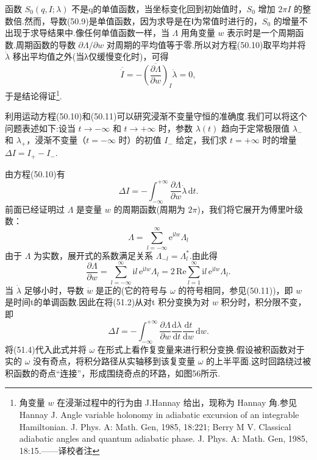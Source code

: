 函数 $S_0(q,I;\lambda)$
不是q的单值函数，当坐标变化回到初始值时，$S_0$ 增加 $2\pi I$
的整数倍.然而，导数(50.9)是单值函数，因为求导是在Ⅰ为常值时进行的，$S_0$
的增量不出现于求导结果中.像任何单值函数一样，当 $\Lambda$
用角变量 $w$
表示时是一个周期函数.周期函数的导数 $\partial\Lambda/\partial w$
对周期的平均值等于零.所以对方程(50.10)取平均并将 $\dot{\lambda}$
移出平均值之外(当λ仅缓慢变化时)，可得
\begin{equation}
  \overline{\dot{I}}
  =-\overline{\left(\frac{\partial\Lambda}{\partial w}\right)}_{I}\dot{\lambda}=0,
\end{equation}
于是结论得证\footnote{角变量 $w$ 在浸渐过程中的行为由 J.Hannay 给出，现称为 Hannay 角.参见 Hannay J. Angle variable holonomy in adiabatic excursion of an integrable Hamiltonian. J. Phys. A: Math. Gen, 1985, 18:221; Berry M V. Classical adiabatic angles and quantum adiabatic phase. J. Phys. A: Math. Gen, 1985, 18:15.——译校者注}.

利用运动方程(50.10)和(50.11)可以研究浸渐不变量守恒的准确度.我们可以将这个问题表述如下:设当
$t\to-\infty$ 和 $t\to+\infty$
时，参数 $\lambda(t)$
趋向于定常极限值 $\lambda_-$ 和 $\lambda_+$，浸渐不变量（$t=-\infty$
时）的初值 $I_-$ 给定，我们求 $t=+\infty$ 时的增量 $\Delta I=I_+-I_-$.

由方程(50.10)有
\begin{equation}
  \Delta I=-\int_{-\infty}^{+\infty}
  \frac{\partial\Lambda}{\partial w}\dot{\lambda}\,\mathrm{d}t.
\end{equation}
前面已经证明过 $\Lambda$ 是变量 $w$
的周期函数(周期为 $2\pi$)，我们将它展开为傅里叶级数：
\begin{equation}
  \Lambda=\sum_{l=-\infty}^{\infty}\mathrm{e}^{\mathrm{i}lw}\Lambda_l
\end{equation}
由于 $\Lambda$
为实数，展开式的系数满足关系 $\Lambda_{-l}=\Lambda_l^*$.由此得
\begin{equation}
  \frac{\partial\Lambda}{\partial w}
  =\sum_{l=-\infty}^{\infty}\mathrm{i}l\,\mathrm{e}^{\mathrm{i}lw}\Lambda_l
  =2\,\mathrm{Re}\sum_{l=1}^{\infty}\mathrm{i}l\,\mathrm{e}^{\mathrm{i}lw}\Lambda_l.
\end{equation}
当 $\dot{\lambda}$ 足够小时，导数 $\dot{w}$
是正的(它的符号与 $\omega$ 的符号相同，参见(50.11))，即 $w$
是时间t的单调函数.因此在将(51.2)从对t 积分变换为对 $w$
积分时，积分限不变，即
\begin{equation}
  \Delta I=-\int_{-\infty}^{+\infty}
  \frac{\partial\Lambda}{\partial w}
  \frac{\mathrm{d}\lambda}{\mathrm{d}t}
  \frac{\mathrm{d}t}{\mathrm{d}w}\,\mathrm{d}w.
\end{equation}
将(51.4)代入此式并将 $\omega$
在形式上看作复变量来进行积分变换.假设被积函数对于实的 $\omega$
没有奇点，将积分路径从实轴移到该复变量 $\omega$
的上半平面.这时回路绕过被积函数的奇点“连接”，形成围绕奇点的环路，如图56所示.

